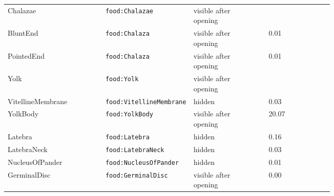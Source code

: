\documentclass[10.5pt,a4paper]{article}
\begin{document}
\begin{table}[htbp]
\begin{tabularx}{\linewidth}{@{}p{0.30\linewidth}p{0.27\linewidth}p{0.17\linewidth}rX@{}}
\hspace*{0.9em}Chalazae & \texttt{food:Chalazae} & visible after opening &  &  \\
\hspace*{1.8em}BluntEnd & \texttt{food:Chalaza} & visible after opening &  & 0.01 \\
\hspace*{1.8em}PointedEnd & \texttt{food:Chalaza} & visible after opening &  & 0.01 \\
\hspace*{0.0em}Yolk & \texttt{food:Yolk} & visible after opening &  &  \\
\hspace*{0.9em}VitellineMembrane & \texttt{food:VitellineMembrane} & hidden &  & 0.03 \\
\hspace*{0.9em}YolkBody & \texttt{food:YolkBody} & visible after opening &  & 20.07 \\
\hspace*{0.9em}Latebra & \texttt{food:Latebra} & hidden &  & 0.16 \\
\hspace*{0.9em}LatebraNeck & \texttt{food:LatebraNeck} & hidden &  & 0.03 \\
\hspace*{0.9em}NucleusOfPander & \texttt{food:NucleusOfPander} & hidden &  & 0.01 \\
\hspace*{0.9em}GerminalDisc & \texttt{food:GerminalDisc} & visible after opening &  & 0.00 \\\bottomrule\end{tabularx}\end{table}
\end{document}

